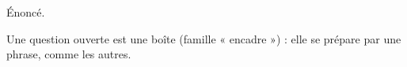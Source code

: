 \begin{theorem}
  Énoncé.
\end{theorem} %

\begin{openquestion}
  Une question ouverte est une boîte (famille « encadre ») : elle se
  prépare par une phrase, comme les autres.
\end{openquestion}
